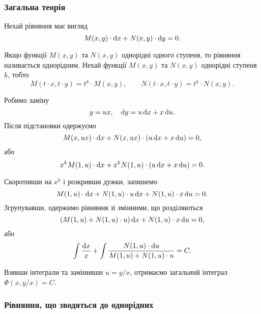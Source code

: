 \subsubsection{Загальна теорія}
Нехай рівняння має вигляд
\begin{equation}
	\label{eq:1.2.1}
	M(x, y) \cdot \mathop{}\!\mathrm{d}	x + N(x, y) \cdot \mathop{}\!\mathrm{d} y = 0.
\end{equation}

Якщо функції $M(x, y)$ та $N(x, y)$ однорідні одного ступеня, то рівняння називається однорідним. Нехай функції $M(x, y)$ та $N(x, y)$ однорідні ступеня $k$, тобто
\begin{equation}
	\label{eq:1.2.2}
	M(t \cdot x, t \cdot y) = t^k \cdot M(x, y), \qquad N(t \cdot x, t \cdot y) = t^k \cdot N(x, y).
\end{equation}

Робимо заміну 
\begin{equation}
	\label{eq:1.2.2_5}
	y = u x, \quad \mathop{}\!\mathrm{d} y = u \mathop{}\!\mathrm{d} x + x \mathop{}\!\mathrm{d} u.
\end{equation}
Після підстановки одержуємо
\begin{equation}
	\label{eq:1.2.3}
	M(x, u x) \cdot \mathop{}\!\mathrm{d} x + N(x, u x) \cdot (u \mathop{}\!\mathrm{d} x + x \mathop{}\!\mathrm{d} u) = 0,
\end{equation}
або 
\begin{equation}
	\label{eq:1.2.4}
	x^k M(1, u) \cdot \mathop{}\!\mathrm{d} x + x^k N(1, u) \cdot (u \mathop{}\!\mathrm{d} x + x \mathop{}\!\mathrm{d} u) = 0.
\end{equation}

Скоротивши на $x^k$ і розкривши дужки, запишемо 
\begin{equation}
	\label{eq:1.2.5}
	M(1, u) \cdot \mathop{}\!\mathrm{d} x + N(1, u) \cdot u \mathop{}\!\mathrm{d} x + N(1, u) \cdot x \mathop{}\!\mathrm{d} u = 0.
\end{equation}
Згрупувавши, одержимо рівняння зі змінними, що розділяються
\begin{equation}
	\label{eq:1.2.6}
	(M(1, u) + N(1, u) \cdot u) \mathop{}\!\mathrm{d} x + N(1, u) \cdot x \mathop{}\!\mathrm{d} u = 0,
\end{equation}
або 
\begin{equation}
	\label{eq:1.2.7}
	\int \frac{\mathop{}\!\mathrm{d} x}{x} + \int \frac{N(1, u) \cdot \mathop{}\!\mathrm{d} u}{M(1, u) + N(1, u) \cdot u} = C.
\end{equation}

Взявши інтеграли та замінивши $u = y / x$, отримаємо загальний інтеграл $\Phi(x, y / x) = C$.

\subsubsection{Рівняння, що зводяться до однорідних}

